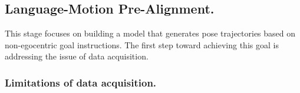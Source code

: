 \subsection{Language-Motion Pre-Alignment.}

\begin{table}
\centering
{}
\caption{\textbf{Datasets Statistics}}
\label{tab:data statistics}
\end{table}

This stage focuses on building a model that generates pose trajectories based on non-egocentric goal instructions. The first step toward achieving this goal is addressing the issue of data acquisition.

\subsubsection{Limitations of data acquisition.}



